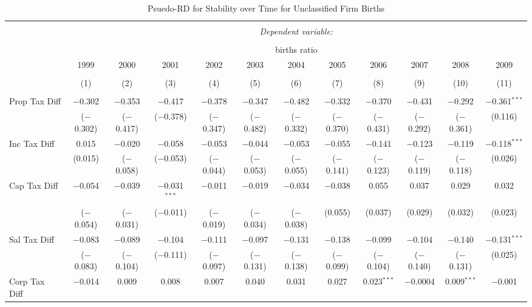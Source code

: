 
\begin{table}[!htbp] \centering 
  \caption{Psuedo-RD for Stability over Time for  Unclassified Firm Births} 
  \label{99year} 
\small 
\begin{tabular}{@{\extracolsep{5pt}}lccccccccccc} 
\\[-1.8ex]\hline 
\hline \\[-1.8ex] 
 & \multicolumn{11}{c}{\textit{Dependent variable:}} \\ 
\cline{2-12} 
\\[-1.8ex] & \multicolumn{11}{c}{births ratio} \\ 
 & 1999 & 2000 & 2001 & 2002 & 2003 & 2004 & 2005 & 2006 & 2007 & 2008 & 2009 \\ 
\\[-1.8ex] & (1) & (2) & (3) & (4) & (5) & (6) & (7) & (8) & (9) & (10) & (11)\\ 
\hline \\[-1.8ex] 
 Prop Tax Diff & $-$0.302 & $-$0.353 & $-$0.417 & $-$0.378 & $-$0.347 & $-$0.482 & $-$0.332 & $-$0.370 & $-$0.431 & $-$0.292 & $-$0.361$^{***}$ \\ 
  & ($-$0.302) & ($-$0.417) & ($-$0.378) & ($-$0.347) & ($-$0.482) & ($-$0.332) & ($-$0.370) & ($-$0.431) & ($-$0.292) & ($-$0.361) & (0.116) \\ 
  Inc Tax Diff & 0.015 & $-$0.020 & $-$0.058 & $-$0.053 & $-$0.044 & $-$0.053 & $-$0.055 & $-$0.141 & $-$0.123 & $-$0.119 & $-$0.118$^{***}$ \\ 
  & (0.015) & ($-$0.058) & ($-$0.053) & ($-$0.044) & ($-$0.053) & ($-$0.055) & ($-$0.141) & ($-$0.123) & ($-$0.119) & ($-$0.118) & (0.026) \\ 
  Cap Tax Diff & $-$0.054 & $-$0.039 & $-$0.031$^{***}$ & $-$0.011 & $-$0.019 & $-$0.034 & $-$0.038 & 0.055 & 0.037 & 0.029 & 0.032 \\ 
  & ($-$0.054) & ($-$0.031) & ($-$0.011) & ($-$0.019) & ($-$0.034) & ($-$0.038) & (0.055) & (0.037) & (0.029) & (0.032) & (0.023) \\ 
  Sal Tax Diff & $-$0.083 & $-$0.089 & $-$0.104 & $-$0.111 & $-$0.097 & $-$0.131 & $-$0.138 & $-$0.099 & $-$0.104 & $-$0.140 & $-$0.131$^{***}$ \\ 
  & ($-$0.083) & ($-$0.104) & ($-$0.111) & ($-$0.097) & ($-$0.131) & ($-$0.138) & ($-$0.099) & ($-$0.104) & ($-$0.140) & ($-$0.131) & (0.025) \\ 
  Corp Tax Diff & $-$0.014 & 0.009 & 0.008 & 0.007 & 0.040 & 0.031 & 0.027 & 0.023$^{***}$ & $-$0.0004 & 0.009$^{***}$ & $-$0.001 \\ 

\end{tabular}
\end{table}
